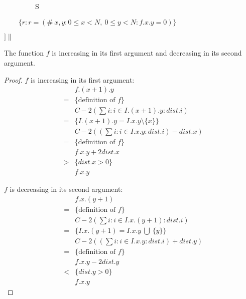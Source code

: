\verb|        | S

\verb|    | $\{r: r = (\#\ x, y: 0 \leq x < N,\  0 \leq y < N: f.x.y = 0) \}$

$]\|$

\medskip

\begin{lem}\label{slope}
The function $f$ is increasing in its first argument and decreasing in its second argument.
\end{lem}

\begin{proof}
$f$ is increasing in its first argument:
\begin{equation*}
\begin{array}{lcl}
		&& f.(x + 1).y \\
	      &=& \{ \mbox{definition of $f$} \} \\      
                  && C - 2 (\sum i: i \in I.(x + 1).y : dist.i) \\
                &=& \{  I.(x + 1).y = I.x.y \setminus \{x\} \} \\
                  &&  C - 2((\sum i: i \in I.x.y : dist.i) - dist.x)  \\
                 &=& \{ \mbox{definition of $f$} \} \\
                 && f.x.y + 2 dist.x \\
                 &>& \{ dist.x > 0 \} \\
                && f.x.y
   \end{array}
\end{equation*}

$f$ is decreasing in its second argument:
\begin{equation*}
\begin{array}{lcl}
		&& f.x.(y + 1) \\
	      &=& \{ \mbox{definition of $f$} \} \\      
                  && C - 2 (\sum i: i \in I.x .(y + 1) : dist.i) \\
                &=& \{  I.x.(y + 1) = I.x.y\ \bigcup\  \{y\} \} \\
                  &&  C - 2((\sum i: i \in I.x.y : dist.i) + dist.y)  \\
                 &=& \{ \mbox{definition of $f$} \} \\
                 && f.x.y - 2 dist.y \\
                 &<& \{ dist.y > 0 \} \\
                && f.x.y
   \end{array}
\end{equation*}
\end{proof}

